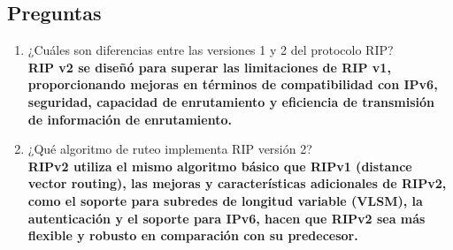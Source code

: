 \documentclass[14pt]{book}
\begin{document}
{\color{red} \subsection*{\textbf{Preguntas}}}
\vspace{1em}

\begin{enumerate}
  \item ¿Cuáles son diferencias entre las versiones 1 y 2 del protocolo RIP?\\
  \textbf{RIP v2 se diseñó para superar las limitaciones de RIP v1, proporcionando mejoras en términos de compatibilidad con IPv6, seguridad, capacidad de enrutamiento y eficiencia de transmisión de información de enrutamiento.}
  \item ¿Qué algoritmo de ruteo implementa RIP versión 2?\\
  \textbf{RIPv2 utiliza el mismo algoritmo básico que RIPv1 (distance vector routing), las mejoras y características adicionales de RIPv2, como el soporte para subredes de longitud variable (VLSM), la autenticación y el soporte para IPv6, hacen que RIPv2 sea más flexible y robusto en comparación con su predecesor.}
\end{enumerate} 
\end{document}
